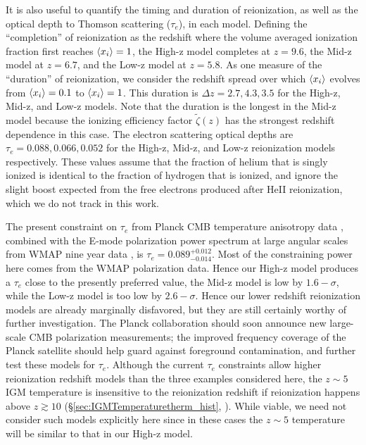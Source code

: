 It is also useful to quantify the timing and duration of reionization, as well as the optical depth to Thomson scattering ($\tau_e$), in each model. 
Defining the ``completion'' of reionization as the redshift where the volume averaged ionization fraction first reaches $\langle x_i \rangle =1$,
the High-z model completes at $z=9.6$,
the Mid-z model at $z=6.7$, and the Low-z model at $z=5.8$. As one measure of the ``duration'' of reionization, we consider the redshift spread over which $\langle x_i \rangle$ evolves from
$\langle x_i \rangle=0.1$ to $\langle x_i \rangle = 1$. This duration is $\Delta z = 2.7, 4.3, 3.5$ for the High-z, Mid-z, and Low-z models. Note that the duration
is the longest in the Mid-z model because the ionizing efficiency factor $\tilde{\zeta}(z)$ has the strongest redshift dependence in this case. 
The electron scattering optical depths are $\tau_e = 0.088, 0.066, 0.052$ for the High-z, Mid-z, and Low-z reionization
models respectively. These values assume that the fraction of helium that is singly ionized is identical to the fraction of hydrogen that
is ionized, and ignore the slight boost expected from the free
electrons produced after HeII reionization, which we do not track in this work. 

The present constraint on $\tau_e$ from Planck CMB temperature anisotropy data \citep{Ade:2013zuv}, combined with the E-mode polarization power spectrum
at large angular scales from WMAP nine year data \citep{Bennett:2012zja}, is $\tau_e = 0.089^{+0.012}_{-0.014}$. Most of the constraining power here
comes from the WMAP polarization data. Hence our High-z model produces a $\tau_e$ close to the presently preferred value, the Mid-z model is low by $1.6-\sigma$, while the Low-z model is too low by $2.6-\sigma$. Hence our lower redshift reionization models are already marginally
disfavored, but they are still certainly worthy of further investigation. The Planck collaboration should soon announce new large-scale CMB
polarization measurements; the improved frequency coverage of the Planck satellite should help guard against foreground contamination, and
further test these models for $\tau_e$.
Although the current $\tau_e$ constraints allow higher reionization redshift models than the three
examples considered here, the $z \sim 5$ IGM temperature is insensitive to the reionization redshift
if reionization happens above $z \gtrsim 10$ (\S \ref{sec:IGMTemperaturetherm_hist}, \citealt{Hui:2003hn}). While viable, we need not consider such models 
explicitly here since in these cases the $z \sim 5$ temperature will be similar to that in our High-z model.


